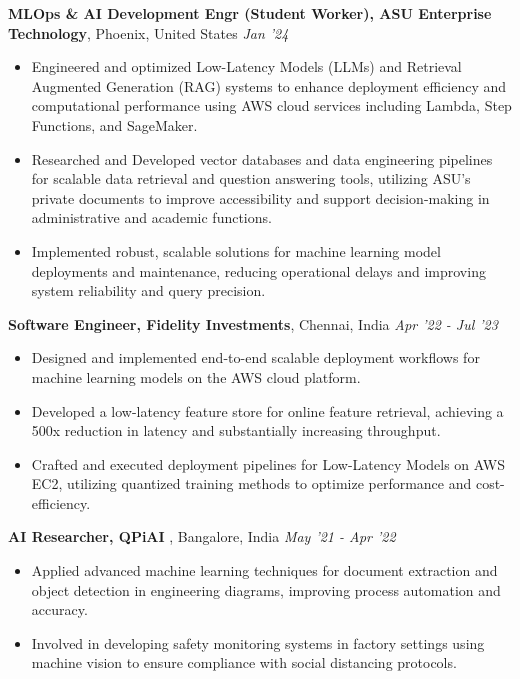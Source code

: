\documentclass[10pt,a4]{article}
\begin{document}
{\begin{flushleft}
        \vspace{1.5mm}
        \textbf{\large MLOps \& AI Development Engr (Student Worker), ASU Enterprise Technology},  \large Phoenix, United States \hfill \textit{\large Jan '24}	\\
		\begin{itemize}
            \item Engineered and optimized Low-Latency Models (LLMs) and Retrieval Augmented Generation (RAG) systems to enhance deployment efficiency and computational performance using AWS cloud services including Lambda, Step Functions, and SageMaker.
            \item Researched and Developed vector databases and data engineering pipelines for scalable data retrieval and question answering tools, utilizing ASU’s private documents to improve accessibility and support decision-making in administrative and academic functions.
            \item Implemented robust, scalable solutions for machine learning model deployments and maintenance, reducing operational delays and improving system reliability and query precision.
        \end{itemize}	
        \vspace{0.5mm}
        \textbf{\large Software Engineer, Fidelity Investments},  \large Chennai, India \hfill \textit{\large Apr '22 - Jul '23}	\\
		\begin{itemize}
            \item Designed and implemented end-to-end scalable deployment workflows for machine learning models on the AWS cloud platform.  
             \item Developed a low-latency feature store for online feature retrieval, achieving a 500x reduction in latency and substantially increasing throughput.
             \item Crafted and executed deployment pipelines for Low-Latency Models on AWS EC2, utilizing quantized training methods to optimize performance and cost-efficiency. 
		\end{itemize}	
  
		\textbf{\large AI Researcher, QPiAI }, \large Bangalore, India \hfill \textit{\large May '21 - Apr '22}	\\
		\begin{itemize}
			  
			\item Applied advanced machine learning techniques for document extraction and object detection in engineering diagrams, improving process automation and accuracy.
			\item Involved in developing safety monitoring systems in factory settings using machine vision to ensure compliance with social distancing protocols.
        \end{itemize}		


\end{flushleft}}
\end{document}
